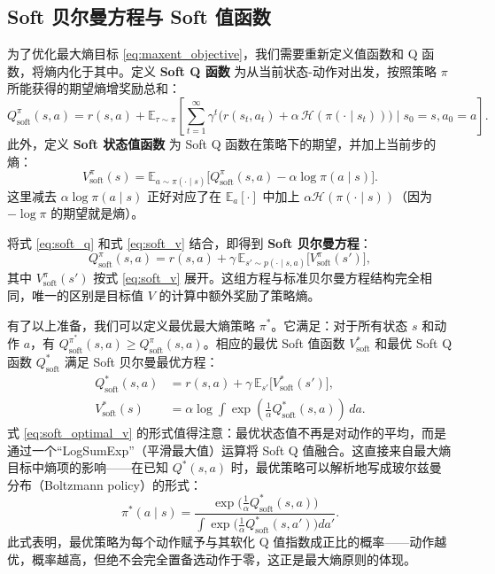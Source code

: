 \subsection{Soft 贝尔曼方程与 Soft 值函数}

为了优化最大熵目标 \eqref{eq:maxent_objective}，我们需要重新定义值函数和 Q 函数，将熵内化于其中。定义 \textbf{Soft Q 函数} 为从当前状态-动作对出发，按照策略 $\pi$ 所能获得的期望熵增奖励总和：
\begin{equation}
Q^\pi_{\text{soft}}(s, a) = r(s, a) + \mathbb{E}_{\tau \sim \pi} \left[ \sum_{t=1}^{\infty} \gamma^t \big( r(s_t, a_t) + \alpha\, \mathcal{H}(\pi(\cdot \mid s_t)) \big) \;\Big|\; s_0 = s, a_0 = a \right].
\label{eq:soft_q}
\end{equation}
此外，定义 \textbf{Soft 状态值函数} 为 Soft Q 函数在策略下的期望，并加上当前步的熵：
\begin{equation}
V^\pi_{\text{soft}}(s) = \mathbb{E}_{a \sim \pi(\cdot \mid s)} \big[ Q^\pi_{\text{soft}}(s, a) - \alpha \log \pi(a \mid s) \big].
\label{eq:soft_v}
\end{equation}
这里减去 $\alpha \log \pi(a \mid s)$ 正好对应了在 $\mathbb{E}_{a}[\cdot]$ 中加上 $\alpha \mathcal{H}(\pi(\cdot \mid s))$（因为 $-\log \pi$ 的期望就是熵）。

将式 \eqref{eq:soft_q} 和式 \eqref{eq:soft_v} 结合，即得到 \textbf{Soft 贝尔曼方程}：
\begin{equation}
Q^\pi_{\text{soft}}(s, a) = r(s, a) + \gamma\, \mathbb{E}_{s' \sim p(\cdot \mid s, a)} \big[ V^\pi_{\text{soft}}(s') \big],
\label{eq:soft_bellman}
\end{equation}
其中 $V^\pi_{\text{soft}}(s')$ 按式 \eqref{eq:soft_v} 展开。这组方程与标准贝尔曼方程结构完全相同，唯一的区别是目标值 $V$ 的计算中额外奖励了策略熵。

有了以上准备，我们可以定义最优最大熵策略 $\pi^*$。它满足：对于所有状态 $s$ 和动作 $a$，有 $Q^{\pi^*}_{\text{soft}}(s, a) \ge Q^\pi_{\text{soft}}(s, a)$。相应的最优 Soft 值函数 $V^*_{\text{soft}}$ 和最优 Soft Q 函数 $Q^*_{\text{soft}}$ 满足 Soft 贝尔曼最优方程：
\begin{align}
Q^*_{\text{soft}}(s, a) &= r(s, a) + \gamma\, \mathbb{E}_{s'} \big[ V^*_{\text{soft}}(s') \big], \label{eq:soft_optimal_bellman_q} \\
V^*_{\text{soft}}(s) &= \alpha \log \int \exp\left( \frac{1}{\alpha} Q^*_{\text{soft}}(s, a) \right) \, da. \label{eq:soft_optimal_v}
\end{align}
式 \eqref{eq:soft_optimal_v} 的形式值得注意：最优状态值不再是对动作的平均，而是通过一个“LogSumExp”（平滑最大值）运算将 Soft Q 值融合。这直接来自最大熵目标中熵项的影响——在已知 $Q^*(s, a)$ 时，最优策略可以解析地写成玻尔兹曼分布（Boltzmann policy）的形式：
\begin{equation}
\pi^*(a \mid s) = \frac{\exp\!\big( \frac{1}{\alpha} Q^*_{\text{soft}}(s, a) \big)}{\int \exp\!\big( \frac{1}{\alpha} Q^*_{\text{soft}}(s, a') \big) da'}.
\label{eq:boltzmann_policy}
\end{equation}
此式表明，最优策略为每个动作赋予与其软化 Q 值指数成正比的概率——动作越优，概率越高，但绝不会完全置备选动作于零，这正是最大熵原则的体现。


